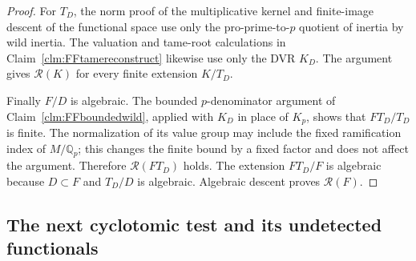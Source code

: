 \documentclass[11pt]{article}
\begin{document}
\begin{proof}
For \(T_D\), the norm proof of the multiplicative
kernel and finite-image descent of the functional
space use only the pro-prime-to-\(p\) quotient
of inertia by wild inertia. The valuation and
tame-root calculations in
Claim~\ref{clm:FFtamereconstruct} likewise use
only the DVR \(K_D\). The argument gives
\(\mathcal R(K)\) for every finite extension
\(K/T_D\).

Finally \(F/D\) is algebraic. The bounded
\(p\)-denominator argument of
Claim~\ref{clm:FFboundedwild}, applied with
\(K_D\) in place of \(K_p\), shows that
\(FT_D/T_D\) is finite. The normalization of
its value group may include the fixed
ramification index of \(M/\mathbb Q_p\);
this changes the finite bound by a fixed factor
and does not affect the argument. Therefore
\(\mathcal R(FT_D)\) holds. The extension
\(FT_D/F\) is algebraic because \(D\subset F\)
and \(T_D/D\) is algebraic. Algebraic descent
proves \(\mathcal R(F)\).
\end{proof}

\subsection{The next cyclotomic test and its undetected functionals}
\end{document}
